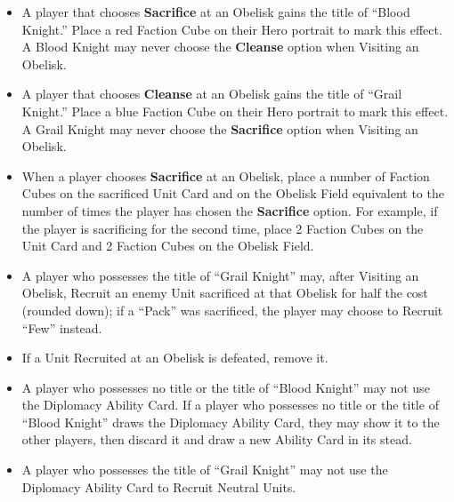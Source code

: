 \begin{multicols*}{2}
\begin{itemize}
\begin{enumerate}[leftmargin=15pt]
\begin{enumerate}
      \item *: Gain 18~, 9~, and 3~. Additionally, \textbf{Search (2)} the Relic Card Deck. Finally, if the Unit Card was on the ``Pack'' side, \textbf{Search (2)} the  Unit Deck; you may Recruit one of these Units for half the cost (rounded down).
    \end{enumerate}
  \end{enumerate}
  \item A player that chooses \textbf{Sacrifice} at an Obelisk gains the title of ``\textcolor{darkcandyapplered}{Blood Knight}.'' Place a red Faction Cube on their Hero portrait to mark this effect. A \textcolor{darkcandyapplered}{Blood Knight} may never choose the \textbf{Cleanse} option when Visiting an Obelisk.
  \item A player that chooses \textbf{Cleanse} at an Obelisk gains the title of ``\textcolor{cobalt}{Grail Knight}.'' Place a blue Faction Cube on their Hero portrait to mark this effect. A \textcolor{cobalt}{Grail Knight} may never choose the \textbf{Sacrifice} option when Visiting an Obelisk.
  \item When a player chooses \textbf{Sacrifice} at an Obelisk, place a number of Faction Cubes on the sacrificed Unit Card and on the Obelisk Field equivalent to the number of times the player has chosen the \textbf{Sacrifice} option. For example, if the player is sacrificing for the second time, place 2 Faction Cubes on the Unit Card and 2 Faction Cubes on the Obelisk Field.
  \item A player who possesses the title of ``\textcolor{cobalt}{Grail Knight}'' may, after Visiting an Obelisk, Recruit an enemy Unit sacrificed at that Obelisk for half the cost (rounded down); if a ``Pack'' was sacrificed, the player may choose to Recruit ``Few'' instead.
  \item If a Unit Recruited at an Obelisk is defeated, remove it.
  \item A player who possesses no title or the title of ``\textcolor{darkcandyapplered}{Blood Knight}'' may not use the Diplomacy Ability Card. If a player who possesses no title or the title of ``\textcolor{darkcandyapplered}{Blood Knight}'' draws the Diplomacy Ability Card, they may show it to the other players, then discard it and draw a new Ability Card in its stead.
  \item A player who possesses the title of ``\textcolor{cobalt}{Grail Knight}'' may not use the Diplomacy Ability Card to Recruit Neutral  Units.

\end{itemize}
\end{multicols*}
